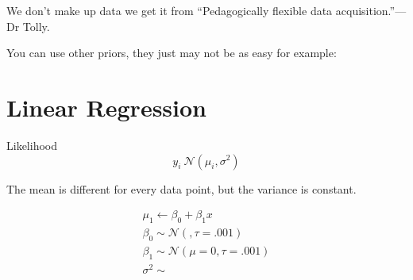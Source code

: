 \documentclass[12pt,letterpaper,oneside]{article}\usepackage{graphicx, color}
\newcommand{\dateTaken}{January 7, 2013}
\begin{document}
 We don't make up data we get it from ``Pedagogically flexible data acquisition.''---Dr Tolly.


You can use other priors, they just may not be as easy for example:


\section{Linear Regression} %
\label{sec:linear_regression}
Likelihood \[ y_{i} ~ \mathcal{N}(\mu_{i}, \sigma^2)\]

The mean is different for every data point, but the variance is constant.

\begin{align*}
    \mu_1 \leftarrow \beta_{0} + \beta_{1} x\\
    \beta_{0} \sim \mathcal{N}(,\tau=.001)\\
    \beta_{1} \sim \mathcal{N}(\mu=0,\tau=.001)\\
    \sigma^{2} \sim \\
\end{align*}
\renewcommand{\dateTaken}{January 24, 2013}
\daysep
\end{document}
